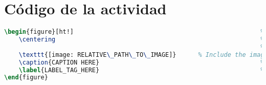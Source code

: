\chapter{Código de la actividad}
\begin{lstlisting}[language=TeX,basicstyle=\tiny]
\begin{figure}[ht!]                                                   % Force here top
    \centering                                                        % Centering the floating image
                                                                      % within the box
    \texttt{[image: RELATIVE\_PATH\_TO\_IMAGE]}      % Include the image
    \caption{CAPTION HERE}                                            % Caption of the floating image
    \label{LABEL_TAG_HERE}                                            % For referencing the image
\end{figure}
\end{lstlisting}\label{ls: imageExample}
